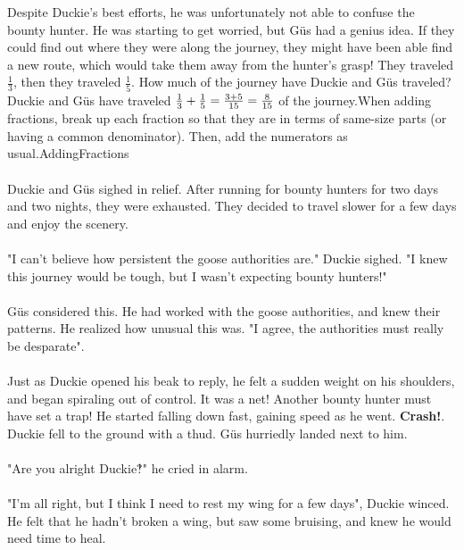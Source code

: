 {Despite Duckie's best efforts, he was unfortunately not able to confuse the bounty hunter. He was starting to get worried, but Güs had a genius idea. If they could find out where they were along the journey, they might have been able find a new route, which would take them away from the hunter's grasp! They traveled $\frac{1}{3}$, then they traveled $\frac{1}{5}$. How much of the journey have Duckie and Güs traveled?}{Duckie and Güs have traveled
$\frac{1}{3}+\frac{1}{5}\linebreak=\frac{3+5}{15}\linebreak=\frac{8}{15}$ of the journey.}{When adding fractions, break up each fraction so that they are in terms of same-size parts (or having a common denominator). Then, add the numerators as usual.}{AddingFractions}
\paragraph{} Duckie and Güs sighed in relief. After running for bounty hunters for two days and two nights, they were exhausted. They decided to travel slower for a few days and enjoy the scenery. 
\paragraph{} "I can't believe how persistent the goose authorities are." Duckie sighed. "I knew this journey would be tough, but I wasn't expecting bounty hunters!"
\paragraph{} Güs considered this. He had worked with the goose authorities, and knew their patterns. He realized how unusual this was. "I agree, the authorities must really be desparate".
\paragraph{} Just as Duckie opened his beak to reply, he felt a sudden weight on his shoulders, and began spiraling out of control. It was a net! Another bounty hunter must have set a trap! He started falling down fast, gaining speed as he went. \textbf{Crash!}. Duckie fell to the ground with a thud. Güs hurriedly landed next to him. 
\paragraph{} "Are you alright Duckie‽" he cried in alarm.
\paragraph{} "I'm all right, but I think I need to rest my wing for a few days", Duckie winced. He felt that he hadn't broken a wing, but saw some bruising, and knew he would need time to heal. 
